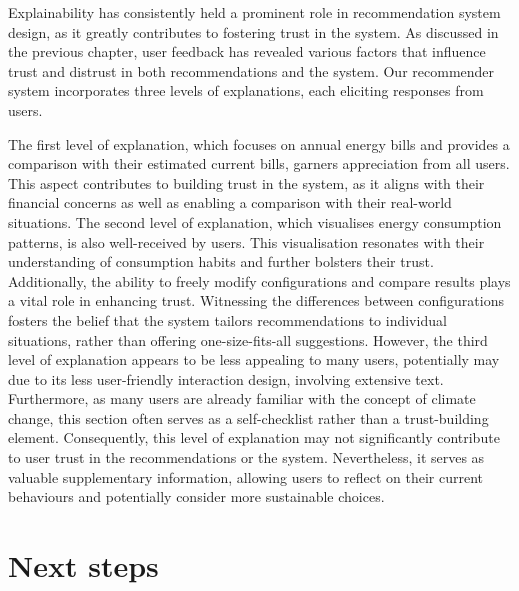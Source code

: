 Explainability has consistently held a prominent role in recommendation system design, as it greatly contributes to fostering trust in the system. 
As discussed in the previous chapter, user feedback has revealed various factors that influence trust and distrust in both recommendations and the system. 
Our recommender system incorporates three levels of explanations, each eliciting responses from users. 

The first level of explanation, which focuses on annual energy bills and provides a comparison with their estimated current bills, garners appreciation from all users. 
This aspect contributes to building trust in the system, as it aligns with their financial concerns as well as enabling a comparison with their real-world situations.
The second level of explanation, which visualises energy consumption patterns, is also well-received by users. 
This visualisation resonates with their understanding of consumption habits and further bolsters their trust.
Additionally, the ability to freely modify configurations and compare results plays a vital role in enhancing trust. 
Witnessing the differences between configurations fosters the belief that the system tailors recommendations to individual situations, rather than offering one-size-fits-all suggestions.
However, the third level of explanation appears to be less appealing to many users, potentially may due to its less user-friendly interaction design, involving extensive text. 
Furthermore, as many users are already familiar with the concept of climate change, this section often serves as a self-checklist rather than a trust-building element.
Consequently, this level of explanation may not significantly contribute to user trust in the recommendations or the system. 
Nevertheless, it serves as valuable supplementary information, allowing users to reflect on their current behaviours and potentially consider more sustainable choices.


\section{Next steps}

